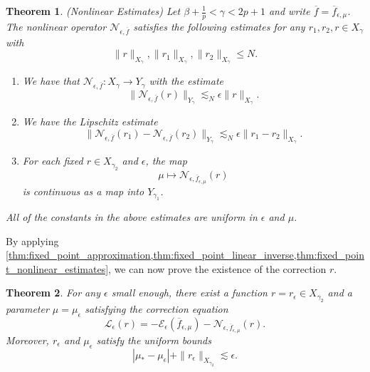 \documentclass[11pt]{amsart}
\newtheorem{theorem}{Theorem}[section]
\theoremstyle{definition}
\theoremstyle{remark}
\numberwithin{equation}{section}
\newcommand{\mc}[1]{\mathcal{#1}}
\newcommand{\ov}[1]{\overline{#1}}
\begin{document}
\begin{theorem}\label{thm:fixed_point_nonlinear_estimates}(Nonlinear Estimates) Let $\beta + \frac{1}{p} < \gamma < 2p + 1$ and write $\ov{f} = \ov{f}_{\epsilon, \mu}$. The nonlinear operator $\mc{N}_{\epsilon, \ov{f}}$ satisfies the following estimates for any $r_1, r_2, r \in X_\gamma$ with \[\|r\|_{X_\gamma}, \|r_1\|_{X_\gamma}, \|r_2\|_{X_\gamma} \leq N.\] 
\begin{enumerate}
    \item We have that $\mc{N}_{\epsilon, \ov{f}}: X_\gamma \to Y_\gamma$ with the estimate
    \begin{equation}\label{eqn:fixed_point_nonlinear_bound}
\|\mc{N}_{\epsilon, \ov{f}}(r)\|_{Y_\gamma} \lesssim_N \epsilon\|r\|_{X_\gamma}.
\end{equation}
    \item We have the Lipschitz estimate
    \begin{equation}\label{eqn:fixed_point_nonlinear_lipschitz}
\|\mc{N}_{\epsilon, \ov{f}}(r_1) - \mc{N}_{\epsilon, \ov{f}}(r_2)\|_{Y_\gamma} \lesssim_{N} \epsilon \|r_1 - r_2\|_{X_\gamma}.
\end{equation}
    \item For each fixed $r \in X_{\gamma_2}$ and $\epsilon$, the map
    \[\mu \mapsto \mc{N}_{\epsilon, \ov{f}_{\epsilon, \mu}}(r)\]
    is continuous as a map into $Y_{\gamma_1}$.
\end{enumerate}
All of the constants in the above estimates are uniform in $\epsilon$ and $\mu$.
\end{theorem}

By applying \cref{thm:fixed_point_approximation,thm:fixed_point_linear_inverse,thm:fixed_point_nonlinear_estimates}, we can now prove the existence of the correction $r$.

\begin{theorem}\label{thm:fixed_point_correction}
    For any $\epsilon$ small enough, there exist a function $r = r_\epsilon \in X_{\gamma_2}$ and a parameter $\mu = \mu_\epsilon$ satisfying the correction equation 
    \begin{equation}\label{eqn:fixed_point_correction}
\mc{L}_\epsilon(r) = -\mc{E}_\epsilon(\ov{f}_{\epsilon, \mu}) - \mc{N}_{\epsilon, \ov{f}_{\epsilon, \mu}}(r).
\end{equation}
    Moreover, $r_\epsilon$ and $\mu_\epsilon$ satisfy the uniform bounds
    \begin{equation}\label{eqn:fixed_point_correction_bound}
|\mu_* - \mu_\epsilon| + \|r_\epsilon\|_{X_{\gamma_2}} \lesssim \epsilon.
\end{equation}
\end{theorem}
\end{document}
